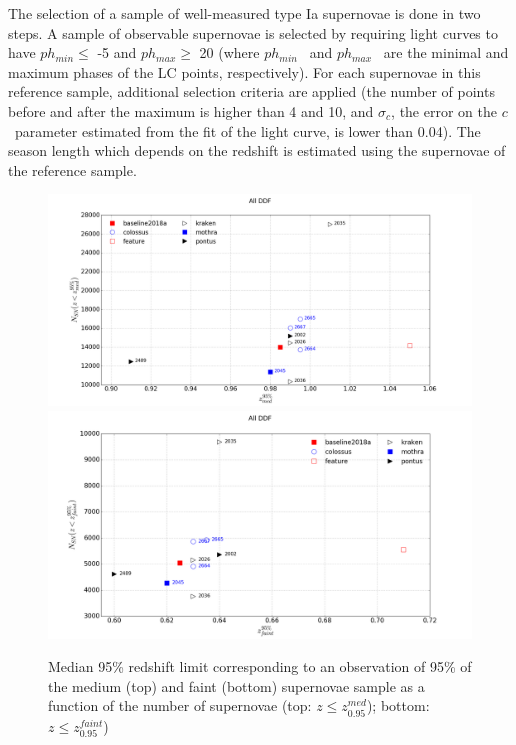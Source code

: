 \documentclass[a4paper,10pt]{article}
\newcommand{\sncolor}{$c$}
\newcommand{\phasemin}{$ph_{min}$}
\newcommand{\phasemax}{$ph_{max}$}
\begin{document}
 The selection of a sample of well-measured type Ia supernovae is done in two steps. A sample of observable supernovae is selected by requiring light curves to have \phasemin $\leq$ -5 and \phasemax $\geq$ 20 (where \phasemin~ and \phasemax~ are the minimal and maximum phases of the LC points, respectively). For each supernovae in this reference sample, additional selection criteria are applied (the number of points before and after the maximum is higher than 4 and 10, and $\sigma_c$, the error on the \sncolor~parameter estimated from the fit of the light curve, is lower than 0.04). The season length which depends on the redshift is estimated using the supernovae of the reference sample.


\begin{figure}[htbp]
  \begin{center}
    \includegraphics[width=\linewidth]{Z95_NSN_med.png}
    \includegraphics[width=\linewidth]{Z95_NSN.png}
    \caption{Median 95\% redshift limit corresponding to an observation of 95\% of the medium (top) and faint (bottom) supernovae sample as a function of the number of supernovae (top: $z\leq z_{0.95}^{med}$); bottom: $z\leq z_{0.95}^{faint}$)}
    \label{fig:z95}
  \end{center}
\end{figure}
\end{document}
